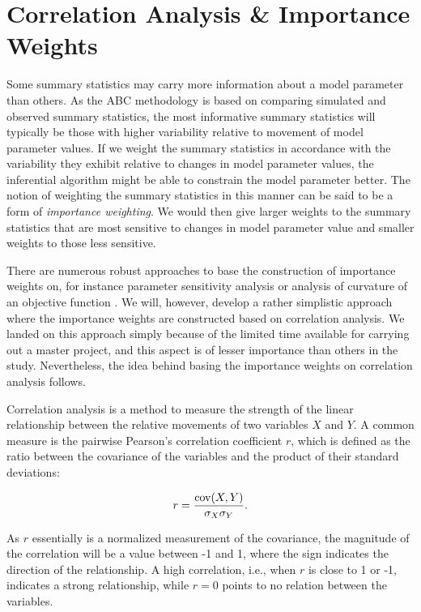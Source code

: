 \section{Correlation Analysis \& Importance Weights}\label{sec:corr_analysis}

Some summary statistics may carry more information about a model parameter than others. As the ABC methodology is based on comparing simulated and observed summary statistics, the most informative summary statistics will typically be those with higher variability relative to movement of model parameter values. If we weight the summary statistics in accordance with the variability they exhibit relative to changes in model parameter values, the inferential algorithm might be able to constrain the model parameter better. The notion of weighting the summary statistics in this manner can be said to be a form of \textit{importance weighting}. We would then give larger weights to the summary statistics that are most sensitive to changes in model parameter value and smaller weights to those less sensitive. 

There are numerous robust approaches to base the construction of importance weights on, for instance parameter sensitivity analysis \cite{uncertainpy} or analysis of curvature of an objective function \cite{druckmann}. We will, however, develop a rather simplistic approach where the importance weights are constructed based on correlation analysis. We landed on this approach simply because of the limited time available for carrying out a master project, and this aspect is of lesser importance than others in the study. Nevertheless, the idea behind basing the importance weights on correlation analysis follows. 

Correlation analysis is a method to measure the strength of the linear relationship between the relative movements of two variables $X$ and $Y$. A common measure is the pairwise Pearson's correlation coefficient $r$, which is defined as the ratio between the covariance of the variables and the product of their standard deviations: 

\begin{equation}
    r = \frac{\mathrm{cov}\qty(X, Y)}{\sigma_X \sigma_Y}.
\end{equation} 

As $r$ essentially is a normalized measurement of the covariance, the magnitude of the correlation will be a value between -1 and 1, where the sign indicates the direction of the relationship. A high correlation, i.e., when $r$ is close to 1 or -1, indicates a strong relationship, while $r=0$ points to no relation between the variables.

